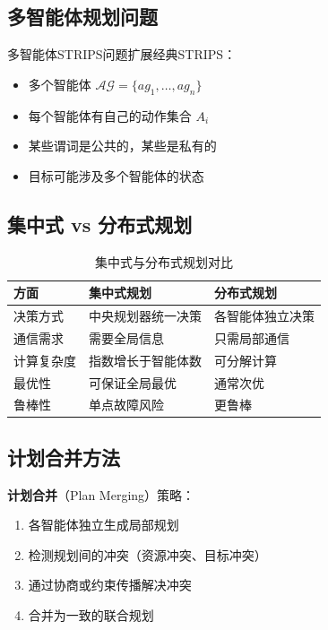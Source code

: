 \subsection{多智能体规划问题}

\begin{definition}[MA-STRIPS]
多智能体STRIPS问题扩展经典STRIPS：
\begin{itemize}
  \item 多个智能体 $\mathcal{AG} = \{ag_1, \ldots, ag_n\}$
  \item 每个智能体有自己的动作集合 $A_i$
  \item 某些谓词是公共的，某些是私有的
  \item 目标可能涉及多个智能体的状态
\end{itemize}
\end{definition}

\subsection{集中式 vs 分布式规划}

\begin{table}[htbp]
\centering
\caption{集中式与分布式规划对比}
\begin{tabular}{p{3cm}p{5cm}p{5cm}}
\toprule
\textbf{方面} & \textbf{集中式规划} & \textbf{分布式规划} \\
\midrule
决策方式 & 中央规划器统一决策 & 各智能体独立决策 \\
通信需求 & 需要全局信息 & 只需局部通信 \\
计算复杂度 & 指数增长于智能体数 & 可分解计算 \\
最优性 & 可保证全局最优 & 通常次优 \\
鲁棒性 & 单点故障风险 & 更鲁棒 \\
\bottomrule
\end{tabular}
\end{table}

\subsection{计划合并方法}

\textbf{计划合并}（Plan Merging）策略：
\begin{enumerate}[leftmargin=2em]
  \item 各智能体独立生成局部规划
  \item 检测规划间的冲突（资源冲突、目标冲突）
  \item 通过协商或约束传播解决冲突
  \item 合并为一致的联合规划
\end{enumerate}

